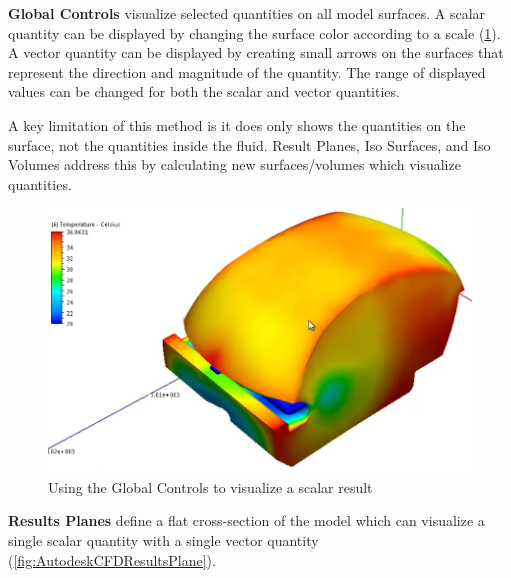 \textbf{Global Controls} visualize selected quantities on all model surfaces.
A scalar quantity can be displayed by changing the surface color according to a scale (\cref{fig:AutodeskCFDGlobalControlsScalar}).
A vector quantity can be displayed by creating small arrows on the surfaces that represent the direction and magnitude of the quantity.
The range of displayed values can be changed for both the scalar and vector quantities.

A key limitation of this method is it does only shows the quantities on the surface, not the quantities inside the fluid.
Result Planes, Iso Surfaces, and Iso Volumes address this by calculating new surfaces/volumes which visualize quantities.

\begin{figure}
    \centering
    \includegraphics[width=\linewidth]{Ch20Research/figures/autodesk_cfd_global_results_scalar.PNG}
    \caption{Using the Global Controls to visualize a scalar result}
    \label{fig:AutodeskCFDGlobalControlsScalar}
\end{figure}

\textbf{Results Planes} define a flat cross-section of the model which can visualize a single scalar quantity with a single vector quantity (\cref{fig:AutodeskCFDResultsPlane}).

